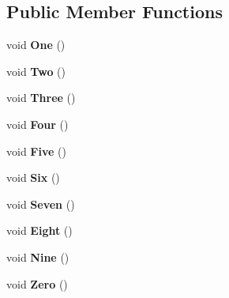 \subsection*{Public Member Functions}
\begin{DoxyCompactItemize}
\item 
\hypertarget{class_simple_calculator_aa3bd09c9f5110a03974370f40e5730b2}{}void {\bfseries One} ()\label{class_simple_calculator_aa3bd09c9f5110a03974370f40e5730b2}

\item 
\hypertarget{class_simple_calculator_aa86e716cba419eab04d54bf6c81813ed}{}void {\bfseries Two} ()\label{class_simple_calculator_aa86e716cba419eab04d54bf6c81813ed}

\item 
\hypertarget{class_simple_calculator_a04d7cbe2f81cc153d7d3585d419748eb}{}void {\bfseries Three} ()\label{class_simple_calculator_a04d7cbe2f81cc153d7d3585d419748eb}

\item 
\hypertarget{class_simple_calculator_a9ac1a3907ac92d44023377d0092c338c}{}void {\bfseries Four} ()\label{class_simple_calculator_a9ac1a3907ac92d44023377d0092c338c}

\item 
\hypertarget{class_simple_calculator_a7f6caf82ea486dfedb07d7255086958c}{}void {\bfseries Five} ()\label{class_simple_calculator_a7f6caf82ea486dfedb07d7255086958c}

\item 
\hypertarget{class_simple_calculator_a39da478b7dc5da6ea463851de861be8b}{}void {\bfseries Six} ()\label{class_simple_calculator_a39da478b7dc5da6ea463851de861be8b}

\item 
\hypertarget{class_simple_calculator_ab7e9de1426acd6994ad9ba410171a2ab}{}void {\bfseries Seven} ()\label{class_simple_calculator_ab7e9de1426acd6994ad9ba410171a2ab}

\item 
\hypertarget{class_simple_calculator_a112c39b663a0666b47131d929fc14943}{}void {\bfseries Eight} ()\label{class_simple_calculator_a112c39b663a0666b47131d929fc14943}

\item 
\hypertarget{class_simple_calculator_a17494a987cba00cfa6af6cfecd379ee5}{}void {\bfseries Nine} ()\label{class_simple_calculator_a17494a987cba00cfa6af6cfecd379ee5}

\item 
\hypertarget{class_simple_calculator_a976544f13100e0d2f9b426e498cefbaf}{}void {\bfseries Zero} ()\label{class_simple_calculator_a976544f13100e0d2f9b426e498cefbaf}


\end{DoxyCompactItemize}
